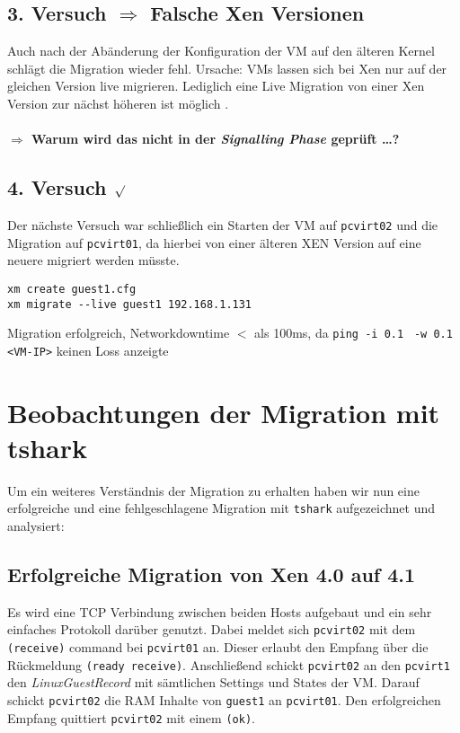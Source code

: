 \subsection {3. Versuch $\Rightarrow$ Falsche Xen Versionen}
Auch nach der Abänderung der Konfiguration der VM auf den älteren Kernel schlägt die Migration wieder fehl. Ursache: VMs lassen sich bei Xen nur auf der gleichen Version live migrieren. Lediglich eine Live Migration von einer Xen Version zur nächst höheren ist möglich \cite{wiki_xen_version}.
\\
\\
\Large
\textbf{$\Rightarrow$ Warum wird das nicht in der \emph{Signalling Phase} geprüft \dots?}
\normalsize

\subsection {4. Versuch $\surd$ }
Der nächste Versuch war schließlich ein Starten der VM auf \verb#pcvirt02# und die Migration auf \verb#pcvirt01#, da hierbei von einer älteren XEN Version auf eine neuere migriert werden müsste.
\setupVerbatimOut
\begin{verbatim} 
xm create guest1.cfg
xm migrate --live guest1 192.168.1.131
\end{verbatim}

Migration erfolgreich, Networkdowntime $<$ als 100ms, da \verb|ping -i 0.1| \verb| -w 0.1 <VM-IP>| keinen Loss anzeigte

\section{Beobachtungen der Migration mit tshark}
Um ein weiteres Verständnis der Migration zu erhalten haben wir nun eine erfolgreiche und eine fehlgeschlagene Migration mit \verb#tshark# aufgezeichnet und analysiert:

\subsection{Erfolgreiche Migration von Xen 4.0 auf 4.1}
Es wird eine TCP Verbindung zwischen beiden Hosts aufgebaut und ein sehr einfaches Protokoll darüber genutzt. Dabei meldet sich \verb#pcvirt02# mit dem \verb|(receive)| command bei \verb#pcvirt01# an. Dieser erlaubt den Empfang über die Rückmeldung \verb|(ready receive)|. Anschließend schickt \verb#pcvirt02# an den \verb#pcvirt1# den \emph{LinuxGuestRecord} mit sämtlichen Settings und States der VM. Darauf schickt \verb#pcvirt02# die RAM Inhalte von \verb#guest1# an \verb#pcvirt01#. Den erfolgreichen Empfang quittiert \verb#pcvirt02# mit einem \verb|(ok)|.

